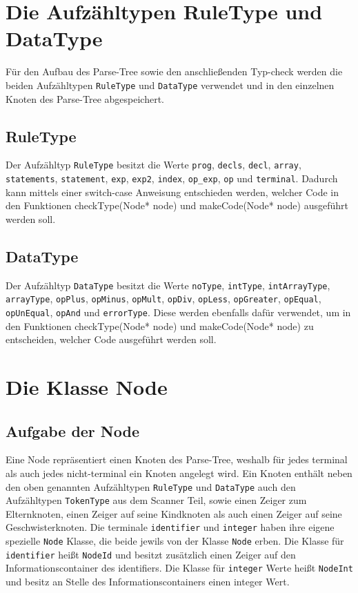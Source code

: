 \documentclass[
a4paper,   %
11pt,      %
oneside,   %
onecolumn, %
final      %
]{article}
\newcommand{\code}[1]{\lstinline$#1$}
\begin{document}
\section{Die Aufzähltypen RuleType und DataType}
Für den Aufbau des Parse-Tree sowie den anschließenden Typ-check werden die beiden Aufzähltypen \code{RuleType} und \code{DataType} verwendet und in den einzelnen Knoten des Parse-Tree abgespeichert.
\subsection{RuleType}
Der Aufzähltyp \code{RuleType} besitzt die Werte \code{prog}, \code{decls}, \code{decl}, \code{array}, \code{statements}, \code{statement}, \code{exp}, \code{exp2}, \code{index}, \code{op_exp}, \code{op} und \code{terminal}. Dadurch kann mittels einer switch-case Anweisung entschieden werden, welcher Code in den Funktionen checkType(Node* node) und makeCode(Node* node) ausgeführt werden soll.
\subsection{DataType}
Der Aufzähltyp \code{DataType} besitzt die Werte \code{noType}, \code{intType}, \code{intArrayType}, \code{arrayType}, \code{opPlus}, \code{opMinus}, \code{opMult}, \code{opDiv}, \code{opLess}, \code{opGreater}, \code{opEqual}, \code{opUnEqual}, \code{opAnd} und \code{errorType}. Diese werden ebenfalls dafür verwendet, um in den Funktionen checkType(Node* node) und makeCode(Node* node) zu entscheiden, welcher Code ausgeführt werden soll.

\section{Die Klasse Node} \label{sec:node}
\subsection{Aufgabe der Node}
Eine Node repräsentiert einen Knoten des Parse-Tree, weshalb für jedes terminal als auch jedes nicht-terminal ein Knoten angelegt wird. Ein Knoten enthält neben den oben genannten Aufzähltypen \code{RuleType} und \code{DataType} auch den Aufzähltypen \code{TokenType} aus dem Scanner Teil, sowie einen Zeiger zum Elternknoten, einen Zeiger auf seine Kindknoten als auch einen Zeiger auf seine Geschwisterknoten.
\newline
Die terminale \code{identifier} und \code{integer} haben ihre eigene spezielle \code{Node} Klasse, die beide jewils von der Klasse \code{Node} erben. Die Klasse für \code{identifier} heißt \code{NodeId} und besitzt zusätzlich einen Zeiger auf den Informationscontainer des identifiers. Die Klasse für \code{integer} Werte heißt \code{NodeInt} und besitz an Stelle des Informationscontainers einen integer Wert.
\end{document}
